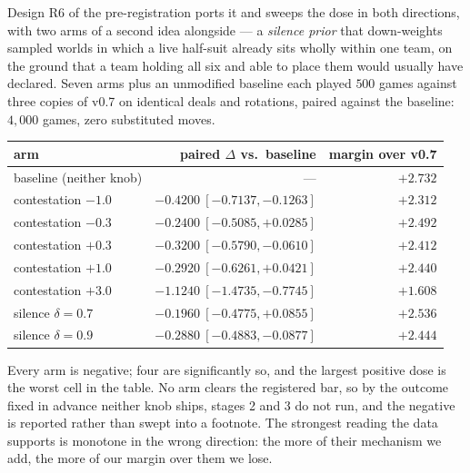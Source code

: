 \documentclass[11pt,a4paper]{article}
\begin{document}
Design R6 of the pre-registration ports it and sweeps the dose in both
directions, with two arms of a second idea alongside --- a
\emph{silence prior} that down-weights sampled worlds in which a live
half-suit already sits wholly within one team, on the ground that a team
holding all six and able to place them would usually have declared. Seven
arms plus an unmodified baseline each played $500$ games against three
copies of v0.7 on identical deals and rotations, paired against the
baseline: $4{,}000$ games, zero substituted moves.

\begin{center}
\begin{tabular}{lrr}
\toprule
arm & paired $\Delta$ vs.\ baseline & margin over v0.7 \\
\midrule
baseline (neither knob)          & ---                       & $+2.732$ \\
contestation $-1.0$              & $-0.4200\ [-0.7137, -0.1263]$ & $+2.312$ \\
contestation $-0.3$              & $-0.2400\ [-0.5085, +0.0285]$ & $+2.492$ \\
contestation $+0.3$              & $-0.3200\ [-0.5790, -0.0610]$ & $+2.412$ \\
contestation $+1.0$              & $-0.2920\ [-0.6261, +0.0421]$ & $+2.440$ \\
contestation $+3.0$              & $-1.1240\ [-1.4735, -0.7745]$ & $+1.608$ \\
silence $\delta = 0.7$           & $-0.1960\ [-0.4775, +0.0855]$ & $+2.536$ \\
silence $\delta = 0.9$           & $-0.2880\ [-0.4883, -0.0877]$ & $+2.444$ \\
\bottomrule
\end{tabular}
\end{center}

Every arm is negative; four are significantly so, and the largest positive
dose is the worst cell in the table. No arm clears the registered bar, so
by the outcome fixed in advance neither knob ships, stages 2 and 3 do not
run, and the negative is reported rather than swept into a footnote. The
strongest reading the data supports is monotone in the wrong direction:
the more of their mechanism we add, the more of our margin over them we
lose.
\end{document}
